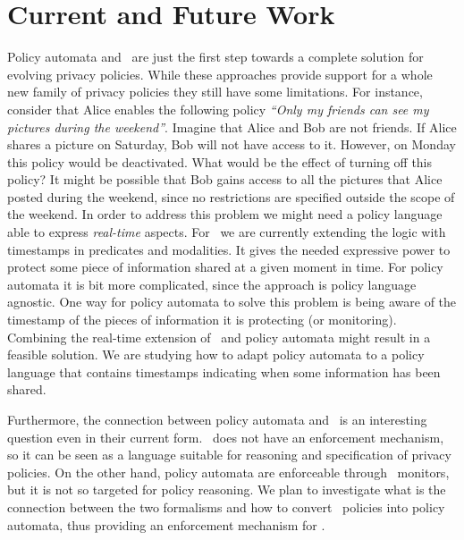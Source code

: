 \vspace{-4mm}
\section{Current and Future Work}

Policy automata and \tfppf~are just the first step towards a complete solution for evolving privacy policies. While these approaches provide support for a whole new family of privacy policies they still have some limitations. For instance, consider that Alice enables the following policy \emph{``Only my friends can see my pictures during the weekend''}. Imagine that Alice and Bob are not friends. If Alice shares a picture on Saturday, Bob will not have access to it. However, on Monday this policy would be deactivated. What would be the effect of turning off this policy? It might be possible that Bob gains access to all the pictures that Alice posted during the weekend, since no restrictions are specified outside the scope of the weekend. In order to address this problem we might need a policy language able to express {\it real-time} aspects. For \tfppf~we are currently extending the logic with timestamps in predicates and modalities. It gives the needed expressive power to protect some piece of information shared at a given moment in time. For policy automata it is bit more complicated, since the approach is policy language agnostic. One way for policy automata to solve this problem is being aware of the timestamp of the pieces of information it is protecting (or monitoring). Combining the real-time extension of \tfppf~and policy automata might result in a feasible solution. We are studying how to adapt policy automata to a policy language that contains timestamps indicating when some information has been shared.

Furthermore, the connection between policy automata and \tfppf~is an interesting question even in their current form. \tfppf~does not have an enforcement mechanism, so it can be seen as a language suitable for reasoning and specification of privacy policies. On the other hand, policy automata are enforceable through \larva~monitors, but it is not so targeted for policy reasoning. We plan to investigate what is the connection between the two formalisms and how to convert \tfppf~policies into policy automata, thus providing an enforcement mechanism for \tfppf.
\vspace{-4mm}
